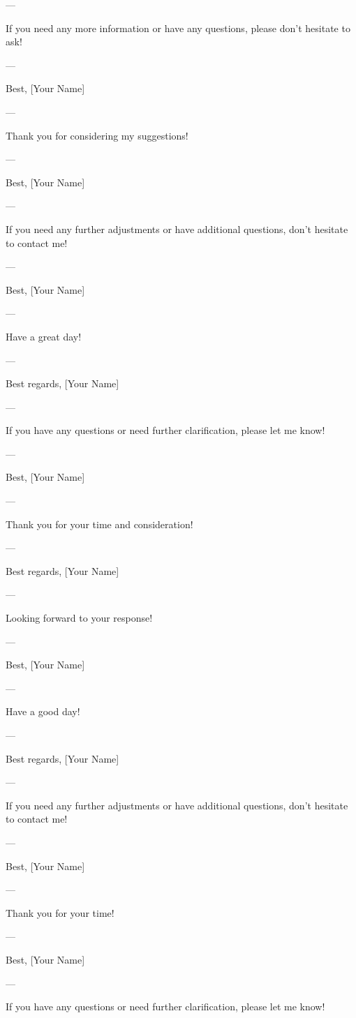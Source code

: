--- 

If you need any more information or have any questions, please don't hesitate to ask! 

--- 

Best,  
[Your Name]  

--- 

Thank you for considering my suggestions! 

--- 

Best,  
[Your Name]  

--- 

If you need any further adjustments or have additional questions, don't hesitate to contact me! 

--- 

Best,  
[Your Name]  

--- 

Have a great day! 

--- 

Best regards,  
[Your Name]  

--- 

If you have any questions or need further clarification, please let me know! 

--- 

Best,  
[Your Name]  

--- 

Thank you for your time and consideration! 

--- 

Best regards,  
[Your Name]  

--- 

Looking forward to your response! 

--- 

Best,  
[Your Name]  

--- 

Have a good day! 

--- 

Best regards,  
[Your Name]  

--- 

If you need any further adjustments or have additional questions, don't hesitate to contact me! 

--- 

Best,  
[Your Name]  

--- 

Thank you for your time! 

--- 

Best,  
[Your Name]  

--- 

If you have any questions or need further clarification, please let me know! 

